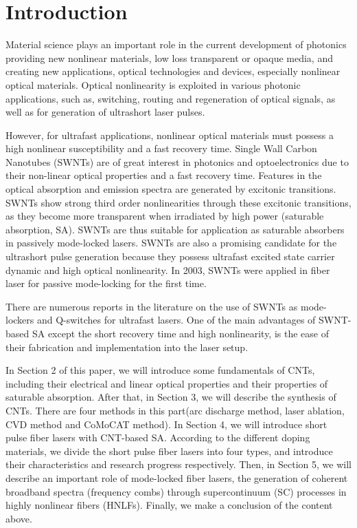 \documentclass{phyasgn}\usepackage{nag}
\begin{document}
\section{Introduction}
Material science plays an important role in the current development of photonics providing new nonlinear materials, low loss transparent or opaque media, and creating new applications, optical technologies and devices, especially nonlinear optical materials. Optical nonlinearity is exploited in various photonic applications, such as, switching, routing and regeneration of optical signals, as well as for generation of ultrashort laser pulses\cite{10.1049/ip-j.1992.0001}.  
\par However, for ultrafast applications, nonlinear optical materials must possess a high nonlinear susceptibility and a fast recovery time. Single Wall Carbon Nanotubes (SWNTs) are of great interest in photonics and optoelectronics due to their non-linear optical properties and a fast recovery time. Features in the optical absorption and emission spectra are generated by excitonic transitions\cite{wang2005optical}. SWNTs show strong third order nonlinearities through these excitonic transitions, as they become more transparent when irradiated by high power (saturable absorption, SA)\cite{chen2002ultrafast,tatsuura2003semiconductor}. SWNTs are thus suitable for application as saturable absorbers in passively mode-locked lasers\cite{sakakibara2005carbon}. SWNTs are also a promising candidate for the ultrashort pulse generation because they possess ultrafast excited state carrier dynamic and high optical nonlinearity. In 2003, SWNTs were applied in fiber laser for passive mode-locking for the first time\cite{chen2002ultrafast}. 
\par There are numerous reports in the literature\cite{goh2005femtosecond,wang2008f,kelleher2010bismuth,solodyankin2008mode,kieu2008all,kelleher2009nanosecond,fedotov2012spectrum,liu2008passively,yu201366,ismail2012nanosecond,liu2015distributed,dong2011short,noronen2015all,ahmad2014mode,chernysheva2014sesam,chernysheva2014higher} on the use of SWNTs as mode-lockers and Q-switches for ultrafast lasers. One of the main advantages of SWNT-based SA except the short recovery time and high nonlinearity, is the ease of their fabrication and implementation into the laser setup. 
\par In Section 2 of this paper, we will introduce some fundamentals of CNTs, including their electrical and linear optical properties and their properties of saturable absorption. After that, in Section 3, we will describe the synthesis of CNTs. There are four methods in this part(arc discharge method, laser ablation, CVD method and CoMoCAT method). In Section 4, we will introduce short pulse fiber lasers with CNT-based SA. According to the different doping materials, we divide the short pulse fiber lasers into four types, and introduce their characteristics and research progress respectively. Then, in Section 5, we will describe an important role of mode-locked fiber lasers, the generation of coherent broadband spectra (frequency combs) through supercontinuum (SC) processes in highly nonlinear fibers (HNLFs). Finally, we make a conclusion of the content above.
\end{document}
